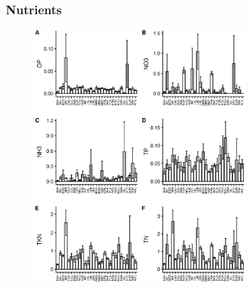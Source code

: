 \begin{frame}
	\frametitle{Nutrients}

	\begin{figure}	
		\includegraphics[width=0.7\textwidth, height=\textheight]{../figures/nutboxplotlake.eps}
	\end{figure}

\end{frame}



